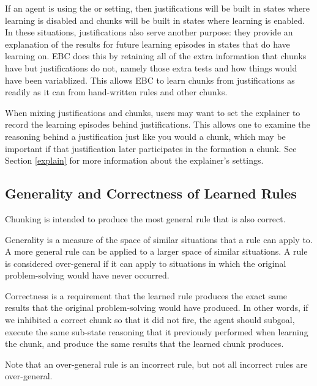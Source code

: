 If an agent is using the  or  setting, then justifications will be built in states where learning is disabled and chunks will be built in states where learning is enabled.  In these situations, justifications also serve another purpose:  they provide an explanation of the results for future learning episodes in states that do have learning on.  EBC does this by retaining all of the extra information that chunks have but justifications do not, namely those extra tests and how things would have been variablized.  This allows EBC to learn chunks from justifications as readily as it can from hand-written rules and other chunks.

When mixing justifications and chunks, users may want to set the explainer to record the learning episodes behind justifications.  This allows one to examine the reasoning behind a justification just like you would a chunk, which may be important if that justification later participates in the formation a chunk. See Section \ref{explain} for more information about the explainer's settings.

\subsection{Generality and Correctness of Learned Rules}
\label{CHUNKING-correctness}

Chunking is intended to produce the most general rule that is also correct. 

Generality is a measure of the space of similar situations that a rule can apply to.  A more general rule can be applied to a larger space of similar situations.  A rule is considered over-general if it can apply to situations in which the original problem-solving would have never occurred.  

Correctness is a requirement that the learned rule produces the exact same results that the original problem-solving would have produced.  In other words, if we inhibited a correct chunk so that it did not fire, the agent should subgoal, execute the same sub-state reasoning that it previously performed when learning the chunk, and produce the same results that the learned chunk produces.

Note that an over-general rule is an incorrect rule, but not all incorrect rules are over-general.  


